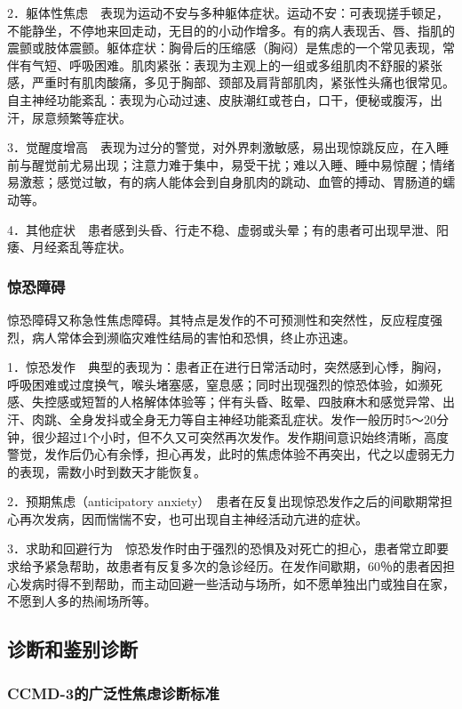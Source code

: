 2．躯体性焦虑　表现为运动不安与多种躯体症状。运动不安：可表现搓手顿足，不能静坐，不停地来回走动，无目的的小动作增多。有的病人表现舌、唇、指肌的震颤或肢体震颤。躯体症状：胸骨后的压缩感（胸闷）是焦虑的一个常见表现，常伴有气短、呼吸困难。肌肉紧张：表现为主观上的一组或多组肌肉不舒服的紧张感，严重时有肌肉酸痛，多见于胸部、颈部及肩背部肌肉，紧张性头痛也很常见。自主神经功能紊乱：表现为心动过速、皮肤潮红或苍白，口干，便秘或腹泻，出汗，尿意频繁等症状。

3．觉醒度增高　表现为过分的警觉，对外界刺激敏感，易出现惊跳反应，在入睡前与醒觉前尤易出现；注意力难于集中，易受干扰；难以入睡、睡中易惊醒；情绪易激惹；感觉过敏，有的病人能体会到自身肌肉的跳动、血管的搏动、胃肠道的蠕动等。

4．其他症状　患者感到头昏、行走不稳、虚弱或头晕；有的患者可出现早泄、阳痿、月经紊乱等症状。

\subsubsection{惊恐障碍}

惊恐障碍又称急性焦虑障碍。其特点是发作的不可预测性和突然性，反应程度强烈，病人常体会到濒临灾难性结局的害怕和恐惧，终止亦迅速。

1．惊恐发作　典型的表现为：患者正在进行日常活动时，突然感到心悸，胸闷，呼吸困难或过度换气，喉头堵塞感，窒息感；同时出现强烈的惊恐体验，如濒死感、失控感或短暂的人格解体体验等；伴有头昏、眩晕、四肢麻木和感觉异常、出汗、肉跳、全身发抖或全身无力等自主神经功能紊乱症状。发作一般历时5～20分钟，很少超过1个小时，但不久又可突然再次发作。发作期间意识始终清晰，高度警觉，发作后仍心有余悸，担心再发，此时的焦虑体验不再突出，代之以虚弱无力的表现，需数小时到数天才能恢复。

2．预期焦虑（anticipatory
anxiety）　患者在反复出现惊恐发作之后的间歇期常担心再次发病，因而惴惴不安，也可出现自主神经活动亢进的症状。

3．求助和回避行为　惊恐发作时由于强烈的恐惧及对死亡的担心，患者常立即要求给予紧急帮助，故患者有反复多次的急诊经历。在发作间歇期，60％的患者因担心发病时得不到帮助，而主动回避一些活动与场所，如不愿单独出门或独自在家，不愿到人多的热闹场所等。

\subsection{诊断和鉴别诊断}

\subsubsection{CCMD-3的广泛性焦虑诊断标准}


